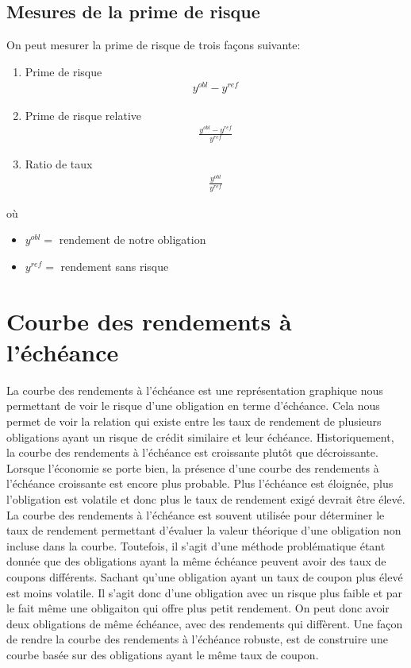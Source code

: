 \documentclass[12pt]{article}
\begin{document}
\subsection{ Mesures de la prime de risque}
On peut mesurer la prime de risque de trois façons suivante:
\begin{enumerate}
\item Prime de risque 
\begin{align*}
y^{obl}-y^{ref}
\end{align*}
\item Prime de risque relative
\begin{align*}
\frac{y^{obl}-y^{ref}}{y^{ref}}
\end{align*}
\item Ratio de taux
\begin{align*}
\frac{y^{obl}}{y^{ref}}
\end{align*}
\end{enumerate}
où 
\begin{itemize}
\item $y^{obl}=$ rendement de notre obligation
\item $y^{ref}=$ rendement sans risque
\end{itemize}
\newpage
\section{ Courbe des rendements à l’échéance}
La courbe des rendements à l'échéance est une représentation graphique nous permettant de voir le risque d'une obligation en terme d'échéance.  Cela nous permet de voir la relation qui existe entre les taux de rendement de plusieurs obligations ayant un risque de crédit similaire et leur échéance.  Historiquement,  la courbe des rendements à l’échéance est croissante plutôt que décroissante.  Lorsque l'économie se porte bien,  la présence d'une courbe des rendements à l’échéance croissante est encore plus probable.  Plus l’échéance est éloignée,  plus l’obligation est volatile et donc plus le taux de rendement exigé devrait être élevé.  La courbe des rendements à l'échéance est souvent utilisée pour déterminer le taux de rendement permettant d’évaluer la valeur théorique d’une obligation non incluse dans la courbe.  Toutefois,  il s'agit d'une méthode problématique étant donnée que des obligations ayant la même échéance peuvent avoir des taux de coupons différents.  Sachant qu'une obligation ayant un taux de coupon plus élevé est moins volatile.  Il s'agit donc d'une obligation avec un risque plus faible et par le fait même une obligaiton qui offre plus petit rendement.   On peut donc avoir deux obligations de même échéance,  avec des rendements qui diffèrent. Une  façon de rendre la courbe des rendements à l'échéance robuste,  est de construire une courbe basée sur des obligations ayant le même taux de coupon.
\end{document}
